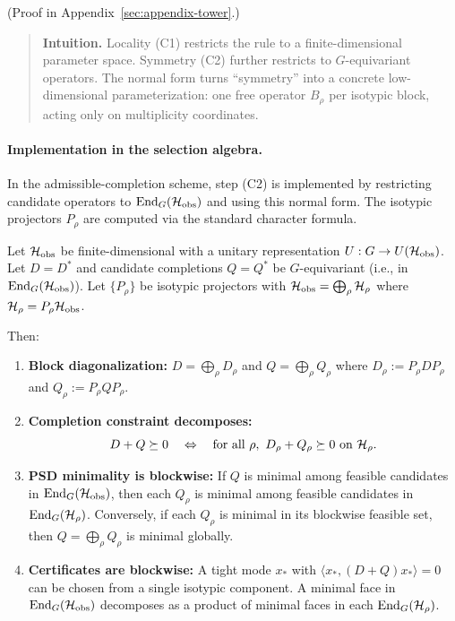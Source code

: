(Proof in Appendix~\ref{sec:appendix-tower}.)

\begin{quote}\small
\textbf{Intuition.}
Locality (C1) restricts the rule to a finite-dimensional parameter space.
Symmetry (C2) further restricts to $G$-equivariant operators.
The normal form turns ``symmetry'' into a concrete low-dimensional parameterization: one free operator $B_\rho$ per isotypic block, acting only on multiplicity coordinates.
\end{quote}

\paragraph{Implementation in the selection algebra.}
In the admissible-completion scheme, step (C2) is implemented by restricting
candidate operators to $\mathrm{End}_G(\mathcal{H}_{\mathrm{obs}})$ and using this
normal form.
The isotypic projectors $P_\rho$ are computed via the standard character formula.

\begin{theorem}
\label{thm:symmetry-reduction-admissibility}
Let $\mathcal{H}_{\mathrm{obs}}$ be finite-dimensional with a unitary representation $U: G \to U(\mathcal{H}_{\mathrm{obs}})$.
Let $D = D^*$ and candidate completions $Q = Q^*$ be $G$-equivariant (i.e., in $\mathrm{End}_G(\mathcal{H}_{\mathrm{obs}})$).
Let $\{P_\rho\}$ be isotypic projectors with $\mathcal{H}_{\mathrm{obs}} = \bigoplus_\rho \mathcal{H}_\rho$ where $\mathcal{H}_\rho = P_\rho \mathcal{H}_{\mathrm{obs}}$.

Then:
\begin{enumerate}[label=(\roman*), itemsep=0.2em]
\item \textbf{Block diagonalization:} $D = \bigoplus_\rho D_\rho$ and $Q = \bigoplus_\rho Q_\rho$ where $D_\rho := P_\rho D P_\rho$ and $Q_\rho := P_\rho Q P_\rho$.
\item \textbf{Completion constraint decomposes:}
\[
D + Q \succeq 0 \quad\Leftrightarrow\quad \text{for all } \rho,\ D_\rho + Q_\rho \succeq 0 \text{ on } \mathcal{H}_\rho.
\]
\item \textbf{PSD minimality is blockwise:} If $Q$ is minimal among feasible candidates in $\mathrm{End}_G(\mathcal{H}_{\mathrm{obs}})$, then each $Q_\rho$ is minimal among feasible candidates in $\mathrm{End}_G(\mathcal{H}_\rho)$.
Conversely, if each $Q_\rho$ is minimal in its blockwise feasible set, then $Q = \bigoplus_\rho Q_\rho$ is minimal globally.
\item \textbf{Certificates are blockwise:} A tight mode $x_*$ with $\langle x_*, (D + Q) x_* \rangle = 0$ can be chosen from a single isotypic component.
A minimal face in $\mathrm{End}_G(\mathcal{H}_{\mathrm{obs}})$ decomposes as a product of minimal faces in each $\mathrm{End}_G(\mathcal{H}_\rho)$.
\end{enumerate}
\end{theorem}


